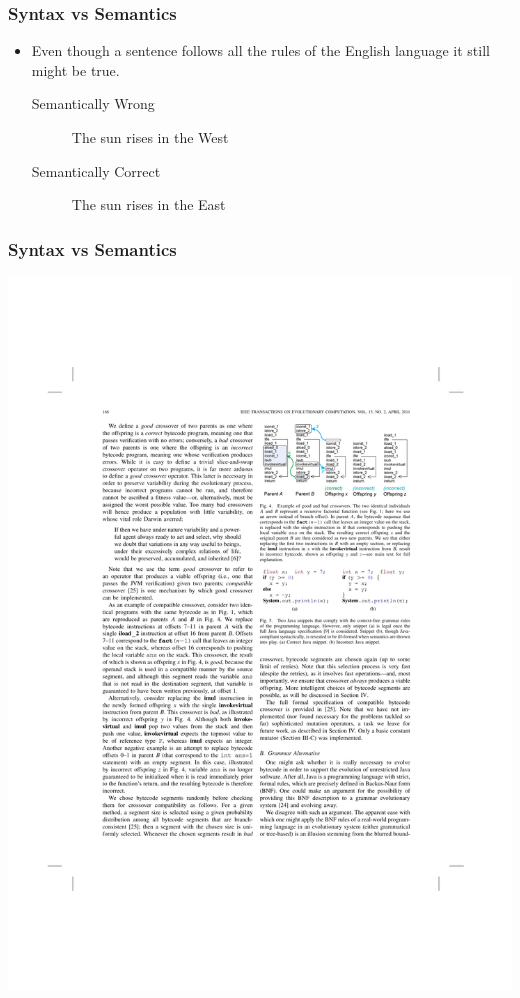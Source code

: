 \documentclass{beamer}
\begin{document}
\begin{frame}
	\frametitle{Syntax vs Semantics}
\begin{itemize}
\item Even though a sentence follows all the rules of the English language it still might be true.
	\\
\begin{description}

\item[Semantically Wrong] The sun rises in the West  
\item[Semantically Correct] The sun rises in the East
\end{description}
\end{itemize}

\end{frame}


\begin{frame}
	\frametitle{Syntax vs Semantics}
   \includegraphics[width=1\textwidth]{Illustrations/semantics.pdf}
       \\
\end{frame}
\end{document}
